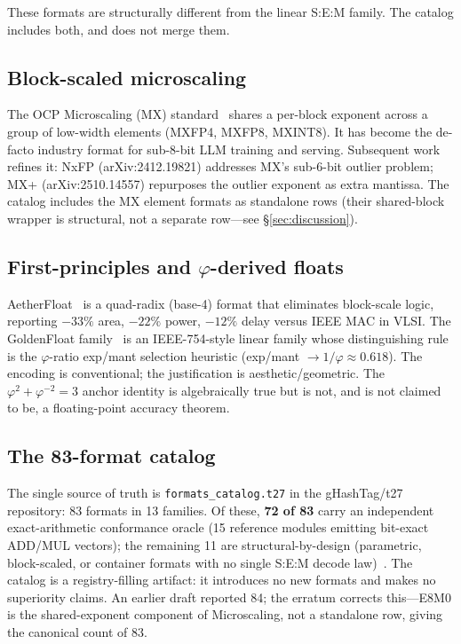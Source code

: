 \documentclass[11pt]{article}
\begin{document}
These formats are structurally different from the linear S:E:M family. The
catalog includes both, and does not merge them.

\subsection{Block-scaled microscaling}

The OCP Microscaling (MX) standard~\cite{rouhani2023mx} shares a per-block
exponent across a group of low-width elements (MXFP4, MXFP8, MXINT8). It has
become the de-facto industry format for sub-8-bit LLM training and serving.
Subsequent work refines it: NxFP (arXiv:2412.19821) addresses MX's sub-6-bit
outlier problem; MX+ (arXiv:2510.14557) repurposes the outlier exponent as
extra mantissa. The catalog includes the MX element formats as standalone rows
(their shared-block wrapper is structural, not a separate row---see \S\ref{sec:discussion}).

\subsection{First-principles and $\varphi$-derived floats}

AetherFloat~\cite{morisaki2026aetherfloat} is a quad-radix (base-4) format that
eliminates block-scale logic, reporting $-33\%$ area, $-22\%$ power, $-12\%$
delay versus IEEE MAC in VLSI. The GoldenFloat
family~\cite{vasilev2026goldenfloat} is an IEEE-754-style linear family whose
distinguishing rule is the $\varphi$-ratio exp/mant selection heuristic
(exp/mant $\to 1/\varphi \approx 0.618$). The encoding is conventional; the
justification is aesthetic/geometric. The $\varphi^{2} + \varphi^{-2} = 3$
anchor identity is algebraically true but is not, and is not claimed to be, a
floating-point accuracy theorem.

\subsection{The 83-format catalog}

The single source of truth is \texttt{formats\_catalog.t27} in the
gHashTag/t27 repository: 83 formats in 13 families. Of these, \textbf{72 of 83}
carry an independent exact-arithmetic conformance oracle (15 reference modules
emitting bit-exact ADD/MUL vectors); the remaining 11 are
structural-by-design (parametric, block-scaled, or container formats with no
single S:E:M decode law)~\cite{vasilev2026catalog}. The catalog is a registry-filling
artifact: it introduces no new formats and makes no superiority claims. An
earlier draft reported 84; the erratum corrects this---E8M0 is the
shared-exponent component of Microscaling, not a standalone row, giving the
canonical count of 83.
\end{document}
